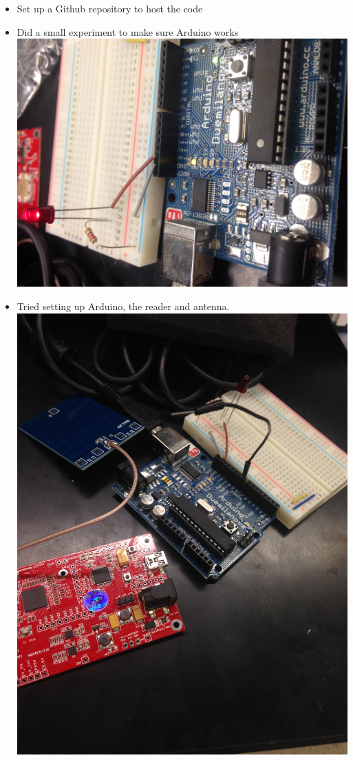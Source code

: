 \documentclass{article}
\begin{document}
	\begin{itemize}
	\item Set up a Github repository to host the code
  \item Did a small experiment to make sure Arduino works\\
  	\includegraphics[scale=0.09,angle=-90]{works.JPG} 
  
  \item Tried setting up Arduino, the reader and antenna. \\
   \includegraphics[scale=0.1,angle=-90]{IMG_2848.JPG} 
\end{itemize}
\end{document}
